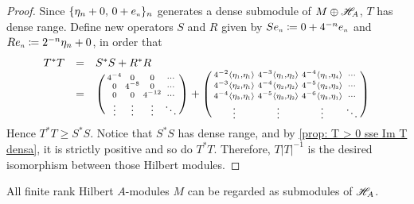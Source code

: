\begin{teorema}
\begin{proof}
Since $\{\eta_n + 0,\,0 + \sub e n  \}_n$ generates a dense submodule of $M\oplus \mathscr H_A$, $T$ has dense range. Define new operators $S$ and $R$ given by $S\sub e n \coloneqq 0 + 4^{-n}\sub e n$ and $R\sub e n \coloneqq 2^{-n}\eta_n + 0$, in order that
\begin{equation*}
    \begin{array}{rcl}
         T^*T &=& S^*S + R^*R \\ 
         &=& \left(\begin{smallmatrix} 
         4^{-4} & 0 & 0 & \cdots\\
         0 & 4^{-8} & 0 & \cdots\\
         0 & 0 & 4^{-12} & \cdots\\
         \vdots & \vdots & \vdots & \ddots
         \end{smallmatrix}\right) + \left(\begin{smallmatrix} 
         4^{-2}\inner{\sub\eta 1}{\sub\eta 1} & 4^{-3}\inner{\sub\eta 1}{\sub\eta 2} & 4^{-4}\inner{\sub\eta 1}{\sub\eta 4}& \cdots\\
         4^{-3}\inner{\sub\eta 2}{\sub\eta 1} & 4^{-4}\inner{\sub\eta 2}{\sub\eta 2} & 4^{-5}\inner{\sub\eta 2}{\sub\eta 3} & \cdots\\
         4^{-4}\inner{\sub\eta 3}{\sub\eta 1} & 4^{-5}\inner{\sub\eta 3}{\sub\eta 2} & 4^{-6}\inner{\sub\eta 3}{\sub\eta 1} & \cdots\\
         \vdots & \vdots & \vdots & \ddots
         \end{smallmatrix}\right)
    \end{array}
\end{equation*}
Hence $T^*T \geqslant S^*S$. Notice that $S^*S$ has dense range, and by \ref{prop: T > 0 sse Im T densa}, it is strictly positive and so do $T^*T$. Therefore, $T |T|^{-1}$ is the desired  isomorphism between those Hilbert modules.
\end{proof}
\end{teorema}

\begin{corolario}
    All finite rank Hilbert $A$-modules $M$ can be regarded as submodules of $\mathscr H_A$.
\end{corolario}

